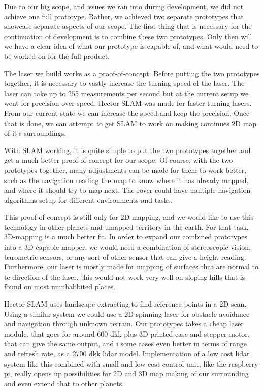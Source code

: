 Due to our big scope, and issues we ran into during development, we did not achieve one full prototype. Rather, we achieved two separate prototypes that showcase separate aspects of our scope. The first thing that is necessary for the continuation of development is to combine these two prototypes. Only then will we have a clear idea of what our prototype is capable of, and what would need to be worked on for the full product.

The laser we build works as a proof-of-concept. Before putting the two prototypes together, it is necessary to vastly increase the turning speed of the laser. The laser can take up to 255 measurements per second but at the current setup we went for precision over speed. Hector SLAM was made for faster turning lasers. From our current state we can increase the speed and keep the precision. Once that is done, we can attempt to get SLAM to work on making continues 2D map of it's surroundings.

With SLAM working, it is quite simple to put the two prototypes together and get a much better proof-of-concept for our scope. Of course, with the two prototypes together, many adjustments can be made for them to work better, such as the navigation reading the map to know where it has already mapped, and where it should try to map next. The rover could have multiple navigation algorithms setup for different environments and tasks. 

This proof-of-concept is still only for 2D-mapping, and we would like to use this technology in other planets and umapped territory in the earth. For that task, 3D-mapping is a much better fit. In order to expand our combined prototypes into a 3D capable mapper, we would need a combination of stereoscopic vision, barometric sensors, or any sort of other sensor that can give a height reading. Furthermore, our laser is mostly made for mapping of surfaces that are normal to te direction of the laser, this would not work very well on sloping hills that is found on most uninhabbited places.

Hector SLAM uses landscape extracting to find reference points in a 2D scan. Using a similar system we could use a 2D spinning laser for obstacle avoidance and navigation through unknown terrain. Our prototypes takes a cheap laser module, that goes for around 600 dkk\cite{lidarl} plus 3D printed case and stepper motor, that can give the same output, and i some cases even better in terms of range and refresh rate, as a 2700 dkk\cite{lidar360} lidar model. Implementation of a low cost lidar system like this combined with small and low cost control unit, like the raspberry pi, really opens up possibilities for 2D and 3D map making of our surrounding and even extend that to other planets. 